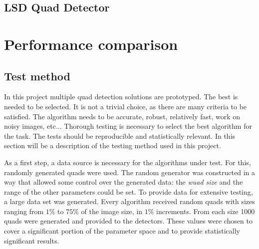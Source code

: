 \subsection{LSD Quad Detector}




\section{Performance comparison}

\subsection{Test method}

In this project multiple quad detection solutions are prototyped.
The best is needed to be selected.
It is not a trivial choice, as there are many criteria to be satisfied.
The algorithm needs to be accurate, robust, relatively fast, work on noisy images, etc...
Thorough testing is necessary to select the best algorithm for the task.
The tests should be reproducible and statistically relevant.
In this section will be a description of the testing method used in this project.

As a first step, a data source is necessary for the algorithms under test.
For this, randomly generated quads were used.
The random generator was constructed in a way that allowed some control over the generated data: the \textit{wuad size} and the range of the other parameters could be set.
To provide data for extensive testing, a large data set was generated.
Every algorithm received random quads with sizes ranging from $1\%$ to $75\%$ of the image size, in $1\%$ increments.
From each size 1000 quads were generated and provided to the detectors.
These values were chosen to cover a significant portion of the parameter space and to provide statistically significant results.


